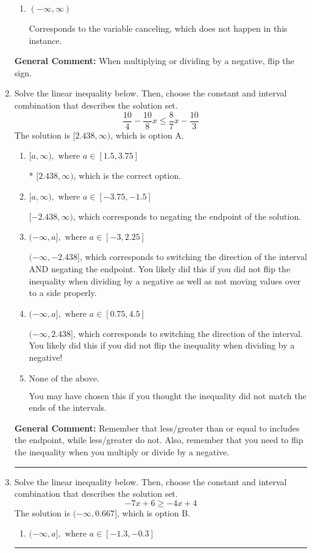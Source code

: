 \documentclass{extbook}[14pt]
\newcommand{\litem}[1]{\item #1

\rule{\textwidth}{0.4pt}}
\begin{document}
\begin{enumerate}
{\begin{enumerate}[label=\Alph*.]
Corresponds to including the endpoints AND negating.
\item \( (-\infty, \infty) \)

Corresponds to the variable canceling, which does not happen in this instance.
\end{enumerate}

\textbf{General Comment:} When multiplying or dividing by a negative, flip the sign.
}
\litem{
Solve the linear inequality below. Then, choose the constant and interval combination that describes the solution set.
\[ \frac{10}{4} - \frac{10}{8} x \leq \frac{8}{7} x - \frac{10}{3} \]The solution is \( [2.438, \infty) \), which is option A.\begin{enumerate}[label=\Alph*.]
\item \( [a, \infty), \text{ where } a \in [1.5, 3.75] \)

* $[2.438, \infty)$, which is the correct option.
\item \( [a, \infty), \text{ where } a \in [-3.75, -1.5] \)

 $[-2.438, \infty)$, which corresponds to negating the endpoint of the solution.
\item \( (-\infty, a], \text{ where } a \in [-3, 2.25] \)

 $(-\infty, -2.438]$, which corresponds to switching the direction of the interval AND negating the endpoint. You likely did this if you did not flip the inequality when dividing by a negative as well as not moving values over to a side properly.
\item \( (-\infty, a], \text{ where } a \in [0.75, 4.5] \)

 $(-\infty, 2.438]$, which corresponds to switching the direction of the interval. You likely did this if you did not flip the inequality when dividing by a negative!
\item \( \text{None of the above}. \)

You may have chosen this if you thought the inequality did not match the ends of the intervals.
\end{enumerate}

\textbf{General Comment:} Remember that less/greater than or equal to includes the endpoint, while less/greater do not. Also, remember that you need to flip the inequality when you multiply or divide by a negative.
}
\litem{
Solve the linear inequality below. Then, choose the constant and interval combination that describes the solution set.
\[ -7x + 6 \geq -4x + 4 \]The solution is \( (-\infty, 0.667] \), which is option B.\begin{enumerate}[label=\Alph*.]
\item \( (-\infty, a], \text{ where } a \in [-1.3, -0.3] \)


\end{enumerate}}
\end{enumerate}
\end{document}
